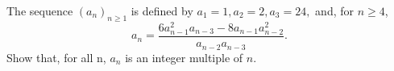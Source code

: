 The sequence $(a_n)_{n\geq 1}$ is defined by $a_1=1, a_2=2, a_3=24,$ and, for $n\geq 4$,
\[a_n = \frac{6a_{n-1}^2a_{n-3} -
8a_{n-1}a_{n-2}^2}{a_{n-2}a_{n-3}}.\]
Show that, for all n, $a_n$ is an integer multiple of $n$.
